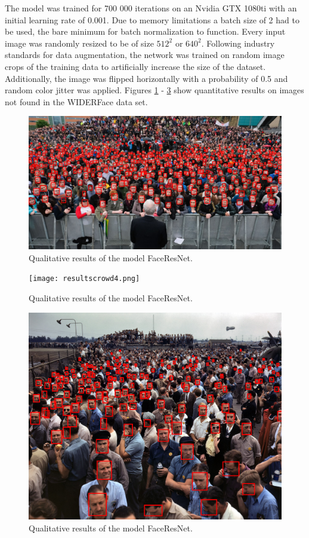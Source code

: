 \documentclass[a4paper, twoside]{article}
\begin{document}
The model was trained for 700 000 iterations on an Nvidia GTX 1080ti with an initial learning rate of 0.001. Due to memory limitations a batch size of 2 had to be used, the bare minimum for batch normalization to function. Every input image was randomly resized to be of size $512^2$ or $640^2$. Following industry standards for data augmentation, the network was trained on random image crops of the training data to artificially increase the size of the dataset. Additionally, the image was flipped horizontally with a probability of 0.5 and random color jitter was applied. Figures \ref{resultscrowd3} - \ref{resultscrowd} show quantitative results on images not found in the WIDERFace data set.
\begin{figure} %
  		\includegraphics[scale=0.185]{resultscrowd3.png}
  		\caption{Qualitative results of the model FaceResNet.}\label{resultscrowd3}
\end{figure}

\begin{figure}
  		\texttt{[image: resultscrowd4.png]}
  		\caption{Qualitative results of the model FaceResNet.}\label{resultscrowd4}
\end{figure}
\begin{figure}[h]
  		\includegraphics[scale=0.32]{resultscrowd.png}
  		\caption{Qualitative results of the model FaceResNet.}\label{resultscrowd}
\end{figure}
\end{document}
